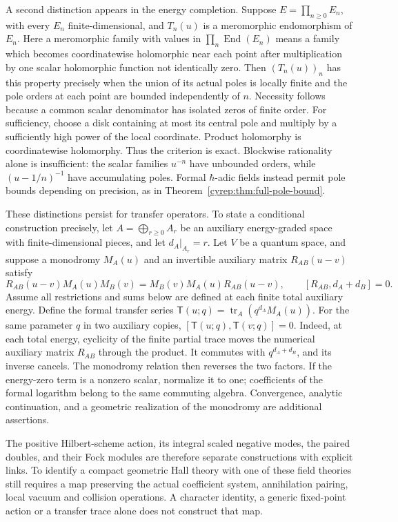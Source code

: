 A second distinction appears in the energy completion.
Suppose \(E=\prod_{n\geq0}E_n\), with every \(E_n\) finite-dimensional,
and \(T_n(u)\) is a meromorphic endomorphism of
\(E_n\). Here a meromorphic family with values in
\(\prod_n\operatorname{End}(E_n)\) means a family which becomes
coordinatewise holomorphic near each point after multiplication
by one scalar holomorphic function not identically zero.
Then \((T_n(u))_n\) has this property precisely when the union
of its actual poles is locally finite and the pole orders at
each point are bounded independently of \(n\).
Necessity follows because a common scalar denominator has isolated
zeros of finite order. For sufficiency, choose a disk containing
at most its central pole and multiply by a sufficiently high power
of the local coordinate. Product holomorphy is coordinatewise
holomorphy. Thus the criterion is exact.
Blockwise rationality alone is insufficient: the scalar families
\(u^{-n}\) have unbounded orders, while \((u-1/n)^{-1}\) have
accumulating poles. Formal \(\hbar\)-adic fields instead permit
pole bounds depending on precision, as in
Theorem~\ref{cyrep:thm:full-pole-bound}.

These distinctions persist for transfer operators. To state a
conditional construction precisely, let \(A=\bigoplus_{r\geq0}A_r\)
be an auxiliary energy-graded space with finite-dimensional pieces,
and let \(d_A|_{A_r}=r\). Let \(V\) be a quantum space, and suppose a monodromy
\(M_A(u)\) and an invertible auxiliary matrix \(R_{AB}(u-v)\)
satisfy
\[
 R_{AB}(u-v)M_A(u)M_B(v)
       =M_B(v)M_A(u)R_{AB}(u-v),
 \qquad [R_{AB},d_A+d_B]=0.
\]
Assume all restrictions and sums below are defined at each finite
total auxiliary energy. Define the formal transfer series
\(\mathsf T(u;q)=\operatorname{tr}_A(q^{d_A}M_A(u))\).
For the same parameter \(q\) in two auxiliary copies,
\([\mathsf T(u;q),\mathsf T(v;q)]=0\).
Indeed, at each total energy, cyclicity of the finite partial
trace moves the numerical auxiliary matrix \(R_{AB}\) through
the product. It commutes with \(q^{d_A+d_B}\), and its inverse
cancels. The monodromy relation then reverses the two factors.
If the energy-zero term is a nonzero scalar, normalize it to one;
coefficients of the formal logarithm belong to the same commuting
algebra. Convergence, analytic continuation, and a geometric
realization of the monodromy are additional assertions.

The positive Hilbert-scheme action, its integral scaled negative
modes, the paired doubles, and their Fock modules are therefore
separate constructions with explicit links. To identify a compact
geometric Hall theory with one of these field theories still
requires a map preserving the actual coefficient system,
annihilation pairing, local vacuum and collision operations.
A character identity, a generic fixed-point action or a transfer
trace alone does not construct that map.
